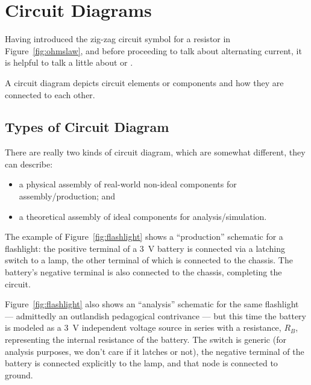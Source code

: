 \documentclass[11pt]{article}
\author{\docauthor}
\title{\doctitle}
\begin{document}
\maketitle


%

\section{Circuit Diagrams}

Having introduced the zig-zag circuit symbol for a resistor in
Figure~\ref{fig:ohmslaw}, and before proceeding to talk about
alternating current, it is helpful to talk a little about
 or .

A circuit diagram depicts circuit elements or components and how they
are connected to each other.

\subsection{Types of Circuit Diagram}

There are really two kinds of circuit diagram, which are somewhat
different, they can describe:

\begin{itemize}
  \item a physical assembly of real-world non-ideal components for assembly/production; and
  \item a theoretical assembly of ideal components for analysis/simulation.
\end{itemize}

The example of Figure~\ref{fig:flashlight} shows a ``production''
schematic for a flashlight: the positive terminal of a 3~\unit{V}
battery is connected via a latching switch to a lamp, the other
terminal of which is connected to the chassis. The battery's negative
terminal is also connected to the chassis, completing the circuit.

Figure~\ref{fig:flashlight} also shows an ``analysis'' schematic for
the same flashlight --- admittedly an outlandish pedagogical
contrivance --- but this time the battery is modeled as a 3~\unit{V}
independent voltage source in series with a resistance, $R_B$,
representing the internal resistance of the battery. The switch is
generic (for analysis purposes, we don't care if it latches or not),
the negative terminal of the battery is connected explicitly to the
lamp, and that node is connected to ground.
\end{document}
